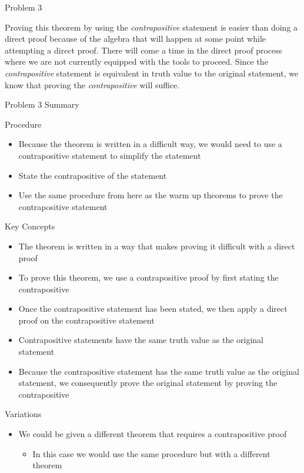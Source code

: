 \begin{problem}{Problem 3}
    \begin{Highlight}[Insights]
        Proving this theorem by using the \textit{contrapositive} statement is easier than doing a direct proof because of the algebra that will happen at some point while attempting a direct proof.
        There will come a time in the direct proof process where we are not currently equipped with the tools to proceed. Since the \textit{contrapositive} statement is equivalent in truth value to
        the original statement, we know that proving the \textit{contrapositive} will suffice.
    \end{Highlight}
\end{problem}

\begin{summary}{Problem 3 Summary}
    \begin{statement}{Procedure}
        \begin{itemize}
            \item Because the theorem is written in a difficult way, we would need to use a contrapositive statement to simplify the statement
            \item State the contrapositive of the statement
            \item Use the same procedure from here as the warm up theorems to prove the contrapositive statement
        \end{itemize}
    \end{statement}
    \begin{statement}{Key Concepts}
        \begin{itemize}
            \item The theorem is written in a way that makes proving it difficult with a direct proof
            \item To prove this theorem, we use a contrapositive proof by first stating the contrapositive
            \item Once the contrapositive statement has been stated, we then apply a direct proof on the contrapositive statement
            \item Contrapositive statements have the same truth value as the original statement
            \item Because the contrapositive statement has the same truth value as the original statement, we consequently prove the original statement by proving the contrapositive
        \end{itemize}
    \end{statement}
    \begin{statement}{Variations}
        \begin{itemize}
            \item We could be given a different theorem that requires a contrapositive proof
            \begin{itemize}
                \item In this case we would use the same procedure but with a different theorem
            \end{itemize}
        \end{itemize}
    \end{statement}
\end{summary}

